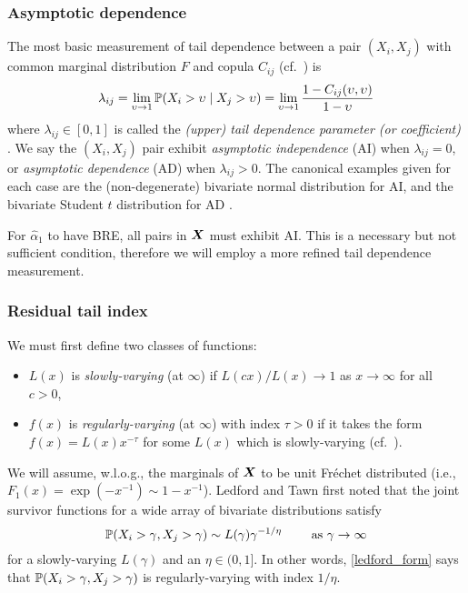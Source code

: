 \subsubsection{Asymptotic dependence} \label{ssec:asymp_dep}

The most basic measurement of tail dependence between a pair $(X_i, X_j)$ with common marginal distribution $F$ and copula $C_{ij}$ (cf.\ \cite{joe1997multivariate,nelsen2007introduction}) is
\[
	\lambda_{ij} = \lim_{\upsilon\to1} \operatorname{{\mathbb P}}(X_i > \upsilon \mid X_j > \upsilon) = \lim_{\upsilon \to 1} \frac{1 - C_{ij}(\upsilon,\upsilon)}{1-\upsilon}
\]
where $\lambda_{ij} \in [0,1]$ is called the \emph{(upper) tail dependence parameter (or coefficient)} \cite{joe1997multivariate,mcneil2015quantitative}. We say the $(X_i,X_j)$ pair exhibit \emph{asymptotic independence} (AI) when $\lambda_{ij} = 0$, or \emph{asymptotic dependence} (AD) when $\lambda_{ij} > 0$. The canonical examples given for each case are the (non-degenerate) bivariate normal distribution for AI, and the bivariate Student $t$ distribution for AD \cite{sibuya1960bivariate}. 

For $\hat{\alpha}_1$ to have BRE, all pairs in $\bm{X}$ must exhibit AI. This is a necessary but not sufficient condition, therefore we will employ a more refined tail dependence measurement.

\subsubsection{Residual tail index}

We must first define two classes of functions:
\begin{itemize}
\item $L(x)$ is \emph{slowly-varying} (at $\infty$) if $L(cx)/L(x) \to 1$ as $x \to \infty$ for all $c > 0$,
\item $f(x)$ is \emph{regularly-varying} (at $\infty$) with index $\tau > 0$ if it takes the form $f(x) = L(x) x^{-\tau}$ for some $L(x)$ which is slowly-varying (cf.\ \cite{bingham1989regular,resnick2013extreme}).
\end{itemize}

We will assume, w.l.o.g., the marginals of $\bm{X}$ to be unit Fr\'echet distributed (i.e., $F_1(x) = \exp(-x^{-1}) \sim 1 - x^{-1}$). Ledford and Tawn \cite{ledford1996statistics,ledford1997modelling,ledford1998concomitant} first noted that the joint survivor functions for a wide array of bivariate distributions satisfy
\begin{equation} \label{ledford_form}
	\operatorname{{\mathbb P}}(X_i > \gamma, X_j > \gamma) \sim L(\gamma) \gamma^{-1/\eta} \qquad \text{ as } \gamma \to \infty
\end{equation}
for a slowly-varying $L(\gamma)$ and an $\eta \in (0, 1]$. In other words, \eqref{ledford_form} says that $\operatorname{{\mathbb P}}(X_i > \gamma, X_j > \gamma)$ is regularly-varying with index $1/\eta$.


